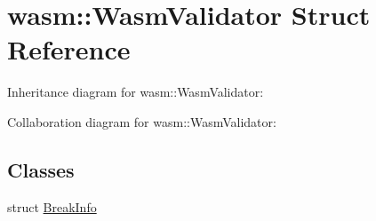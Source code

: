 \hypertarget{structwasm_1_1_wasm_validator}{}\section{wasm\+:\+:Wasm\+Validator Struct Reference}
\label{structwasm_1_1_wasm_validator}


Inheritance diagram for wasm\+:\+:Wasm\+Validator\+:


Collaboration diagram for wasm\+:\+:Wasm\+Validator\+:
\subsection*{Classes}
\begin{DoxyCompactItemize}
\item 
struct \mbox{\hyperlink{structwasm_1_1_wasm_validator_1_1_break_info}{Break\+Info}}
\end{DoxyCompactItemize}
